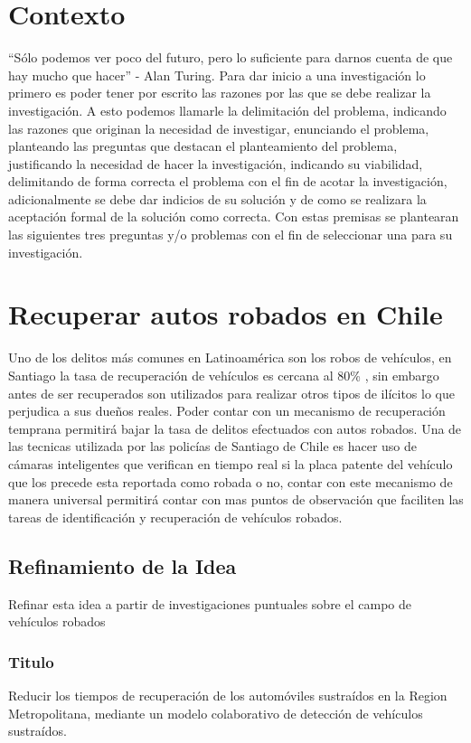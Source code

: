 \documentclass[12pt,letterpaper]{article}
\begin{document}
\section{Contexto}

“Sólo podemos ver poco del futuro, pero lo suficiente para darnos cuenta de que hay mucho que hacer” - Alan Turing.
Para dar inicio a una investigación lo primero es poder tener por escrito las razones por las que se debe realizar la investigación. A esto podemos llamarle la delimitación del problema, indicando las razones que originan la necesidad de investigar, enunciando el problema, planteando las preguntas que destacan  el planteamiento del problema, justificando la necesidad de hacer la investigación, indicando su viabilidad, delimitando de forma correcta el problema con el fin de acotar la investigación, adicionalmente se debe dar indicios de su solución y de como se realizara la aceptación formal de la solución como correcta.
Con estas premisas se plantearan las siguientes tres preguntas y/o problemas con el fin de seleccionar una para su investigación.


\section{Recuperar autos robados en Chile}

Uno de los delitos más comunes en Latinoamérica son los robos de vehículos\autocite{robos}, en Santiago la tasa de recuperación de vehículos es cercana al 80\% \autocite{recupero}, sin embargo antes de ser recuperados son utilizados para realizar otros tipos de ilícitos lo que perjudica a sus dueños reales. Poder contar con un mecanismo de recuperación temprana permitirá bajar la tasa de delitos efectuados con autos robados. Una de las tecnicas utilizada por las policías de Santiago de Chile es hacer uso de cámaras inteligentes\autocite{recono} que verifican en tiempo real si la placa patente del vehículo que los precede esta reportada como robada o no, contar con este mecanismo de manera universal permitirá contar con mas puntos de observación que faciliten las tareas de identificación y recuperación de vehículos robados.

\subsection{Refinamiento de la Idea}
Refinar esta idea a partir de investigaciones puntuales sobre el campo de vehículos robados

\subsubsection{Titulo}
Reducir los tiempos de recuperación de los automóviles sustraídos en la Region Metropolitana, mediante un modelo colaborativo de detección de vehículos sustraídos.
\end{document}
